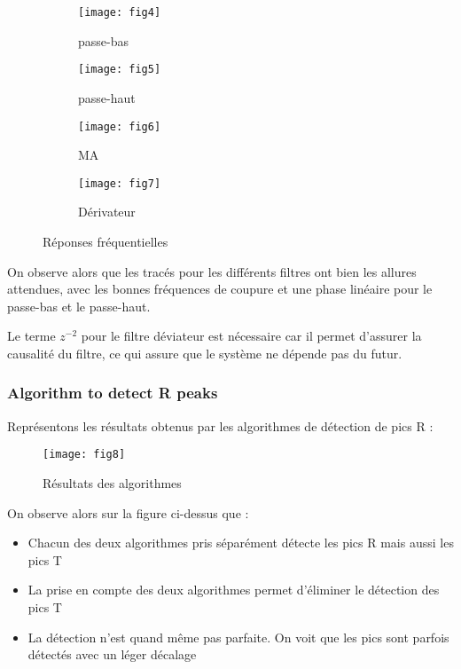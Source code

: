 \documentclass[12pt,a4paper,titlepage]{article}
\begin{document}
\begin{figure}[H]
\begin{subfigure}{.5\textwidth}
  \centering
  \texttt{[image: fig4]}  
  \caption{passe-bas}
  \label{fig:sub-first}
\end{subfigure}
\begin{subfigure}{.5\textwidth}
  \centering
  \texttt{[image: fig5]}  
  \caption{passe-haut}
  \label{fig:sub-second}
\end{subfigure}

\newline

\begin{subfigure}{.5\textwidth}
  \centering
  \texttt{[image: fig6]}  
  \caption{MA}
  \label{fig:sub-third}
\end{subfigure}
\begin{subfigure}{.5\textwidth}
  \centering
  \texttt{[image: fig7]}  
  \caption{Dérivateur}
  \label{fig:sub-fourth}
\end{subfigure}
\caption{Réponses fréquentielles}
\label{fig:fig}
\end{figure}

On observe alors que les tracés pour les différents filtres ont bien les allures attendues, 
avec les bonnes fréquences de coupure et une phase linéaire pour le passe-bas et le 
passe-haut.

Le terme $z^{-2}$ pour le filtre déviateur est nécessaire car il permet d'assurer la
causalité du filtre, ce qui assure que le système ne dépende pas du futur.

\subsubsection{Algorithm to detect R peaks}

Représentons les résultats obtenus par les algorithmes de détection de pics R :

\begin{figure}[H]
    \caption{Résultats des algorithmes}
    \texttt{[image: fig8]}
    \centering
\end{figure}

On observe alors sur la figure ci-dessus que :

\begin{itemize}
    \item{Chacun des deux algorithmes pris séparément détecte les pics R mais aussi les
            pics T}
    \item{La prise en compte des deux algorithmes permet d'éliminer le détection des pics
            T}
    \item{La détection n'est quand même pas parfaite. On voit que les pics sont parfois
            détectés avec un léger décalage}
\end{itemize}
\end{document}
